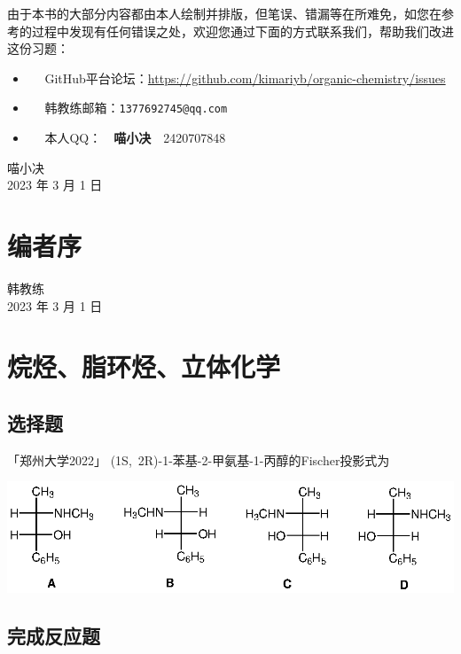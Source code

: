 \documentclass[
  10pt,
  twoside,
  openany,
  b5paper, %
  colorscheme = basic, %
]{qyxf-book}
\begin{document}
由于本书的大部分内容都由本人绘制并排版，但笔误、错漏等在所难免，如您在参考的过程中发现有任何错误之处，欢迎您通过下面的方式联系我们，帮助我们改进这份习题：
\begin{itemize}
	\item \faGithub ~~ GitHub平台论坛：\url{https://github.com/kimariyb/organic-chemistry/issues}
	\item \faEnvelopeOpen ~~ 韩教练邮箱：\texttt{1377692745@qq.com}
	\item \faQq ~~ 
	本人QQ：~~\textbf{喵小决}~~2420707848
\end{itemize}

\begin{flushright}
	喵小决\\
	2023 年 3 月 1 日
\end{flushright}

\chapter*{编者序}



\begin{flushright}
	韩教练\\
	2023 年 3 月 1 日
\end{flushright}

\cleardoublepage


\tableofcontents

\chapter{烷烃、脂环烃、立体化学}

\section{选择题}

 「郑州大学2022」 (1S,\ 2R)-1-苯基-2-甲氨基-1-丙醇的Fischer投影式为
\begin{scheme}[ht]
	\includegraphics{chapter1/01/001.eps}
\end{scheme}

\section{完成反应题}
\end{document}
